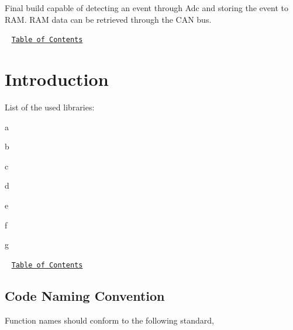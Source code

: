 Final build capable of detecting an event through Adc and storing the event to R\+AM. R\+AM data can be retrieved through the C\+AN bus.

~\newline
\href{#Contents}{\tt Table of Contents}~\newline
 



\label{_Libraries}%
 \hypertarget{index_intro_sec}{}\section{Introduction}\label{index_intro_sec}
List of the used libraries\+: 
\begin{DoxyItemize}
\item a 
\item b 
\item c 
\item d 
\item e 
\item f 
\item g 
\end{DoxyItemize}

~\newline
\href{#Contents}{\tt Table of Contents}~\newline






\label{_CodingStandard}%
\hypertarget{index_CNC}{}\subsection{Code Naming Convention}\label{index_CNC}
Function names should conform to the following standard, ~\newline

